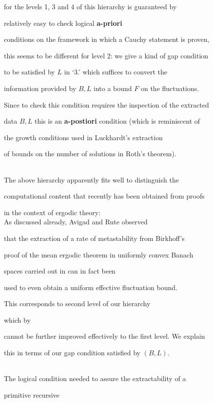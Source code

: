 \documentclass[1p]{elsarticle}
\theoremstyle{plain}
\theoremstyle{definition}
\theoremstyle{remark}
\theoremstyle{definition}
\begin{document}
for the levels 1, 3 and 4 of this hierarchy is guaranteed by 

relatively easy to check logical {\bf a-priori}  

conditions on the framework in which a Cauchy statement is proven, 

this seems to be different for level 2: we give a kind of gap condition 

to be satisfied by $L$ in `3.' which suffices to convert the 

information provided by $B,L$ into a bound $F$ on the fluctuations. 

Since to check this condition requires the inspection of the extracted 

data $B,L$ this is an {\bf a-postiori} condition (which is reminiscent of 

the growth conditions used in Luckhardt's \cite{Luckhardt(89)} extraction 

of bounds on the number of solutions in Roth's theorem).

\\[2mm] 

The above hierarchy apparently fits well to distinguish the 

computational content that recently has been obtained from proofs 

in the context of ergodic theory: \\[1mm] 

As discussed already, Avigad and Rute \cite{Avigad/Rute} observed 

that the extraction of a rate of metastability from Birkhoff's 

proof of the mean ergodic theorem in uniformly convex Banach 

spaces carried out in \cite{Kohlenbach/Leustean4} can in fact been 

used to even obtain a uniform effective fluctuation bound.  

This corresponds to second level of our hierarchy 

which by \cite{Avigad/Gerhardy/Towsner} 

cannot be further improved effectively to the first level. We explain 

this in terms of our gap condition satisfied by $(B,L).$

\\[1mm] The logical condition needed to assure the extractability of a 

primitive recursive 
\end{document}
